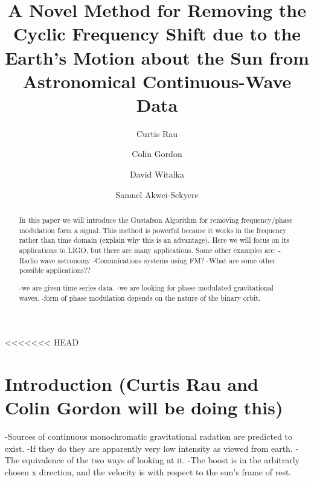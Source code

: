 \documentclass[twocolumn, groupedaddress]{revtex4-1}
\begin{document}
\author{Curtis Rau}
\author{Colin Gordon}
\author{David Witalka}
\author{Samuel Akwei-Sekyere}
\title{A Novel Method for Removing the Cyclic Frequency Shift due to the Earth's Motion about the Sun from Astronomical Continuous-Wave Data}

\begin{abstract}
In this paper we will introduce the Gustafson Algorithm for removing frequency/phase modulation form a signal.  This method is powerful because it works in the frequency rather than time domain (explain why this is an advantage).  Here we will focus on its applications to LIGO, but there are many applications.  Some other examples are:
-Radio wave astronomy
-Comunications systems using FM?
-What are some other possible applications??

-we are given time series data.
-we are looking for phase modulated gravitational waves.
-form of phase modulation depends on the nature of the binary orbit.
\citep{Saulson}
\citep{LSCall}
\citep{Deanna}
\citep{folland}
\citep{griffiths}
\end{abstract}

\maketitle



<<<<<<< HEAD
\section{Introduction (Curtis Rau and Colin Gordon will be doing this)}

-Sources of continuous monochromatic gravitational radation are predicted to exist.
-If they do they are apparently very low intensity as viewed from earth.
-The equivalence of the two ways of looking at it.
-The boost is in the arbitrarly chosen x direction, and the velocity is with respect to the sun's frame of rest.
\end{document}
